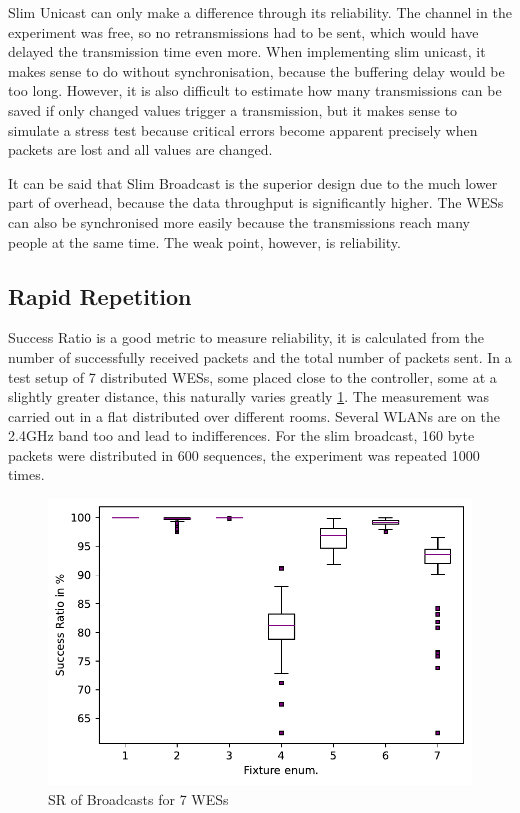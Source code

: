 Slim Unicast can only make a difference through its reliability.
The channel in the experiment was free, so no retransmissions had to be sent, which would have delayed the transmission time even more.
When implementing slim unicast, it makes sense to do without synchronisation, because the buffering delay would be too long.
However, it is also difficult to estimate how many transmissions can be saved if only changed values trigger a transmission,
but it makes sense to simulate a stress test because critical errors become apparent precisely
when packets are lost and all values are changed.

It can be said that Slim Broadcast is the superior design due to the much lower part of overhead, 
because the data throughput is significantly higher.
The WESs can also be synchronised more easily because the transmissions reach many people at the same time.
The weak point, however, is reliability.

\subsection*{Rapid Repetition}

Success Ratio is a good metric to measure reliability, 
it is calculated from the number of successfully received packets and the total number of packets sent.
In a test setup of 7 distributed WESs, some placed close to the controller, some at a slightly greater distance,
this naturally varies greatly \cref{fig:sr_broadcast}.
The measurement was carried out in a flat distributed over different rooms.
Several WLANs are on the 2.4GHz band too and lead to indifferences.
For the slim broadcast, 160 byte packets were distributed in 600 sequences, the experiment was repeated 1000 times.

\begin{figure}[h]
	\centering
	\includegraphics[scale=0.6]{../Plot2/Graphs/SR_per_fixture_broadcast.pdf}
	\caption{SR of Broadcasts for 7 WESs}
	\label{fig:sr_broadcast}
\end{figure}

